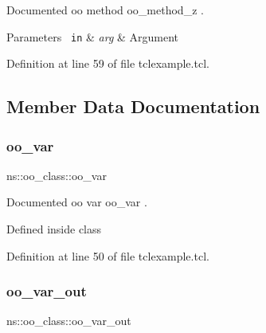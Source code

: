 Documented oo method {\ttfamily oo\+\_\+method\+\_\+z} . 


\begin{DoxyParams}[1]{Parameters}
\mbox{\texttt{ in}}  & {\em arg} & Argument \\
\hline
\end{DoxyParams}


Definition at line 59 of file tclexample.\+tcl.


\begin{DoxyCode}{0}

\end{DoxyCode}


\subsection{Member Data Documentation}
\mbox{\label{classns_1_1oo__class_a741f11f4a2db3876205658d4a9a279ba}} 
\subsubsection{\texorpdfstring{oo\_var}{oo\_var}}
{\footnotesize\ttfamily ns\+::oo\+\_\+class\+::oo\+\_\+var\hspace{0.3cm}{\ttfamily [static]}}



Documented oo var {\ttfamily oo\+\_\+var} . 

Defined inside class 

Definition at line 50 of file tclexample.\+tcl.


\begin{DoxyCode}{0}

\end{DoxyCode}
\mbox{\label{classns_1_1oo__class_af46293ede16067c38ca2901416cad8ee}} 
\subsubsection{\texorpdfstring{oo\_var\_out}{oo\_var\_out}}
{\footnotesize\ttfamily ns\+::oo\+\_\+class\+::oo\+\_\+var\+\_\+out\hspace{0.3cm}{\ttfamily [static]}}



